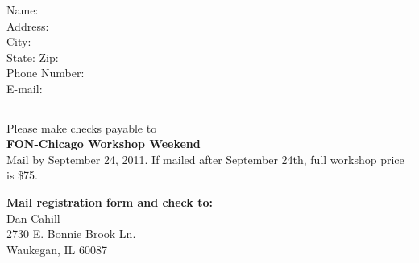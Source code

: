 \documentclass[letterpaper]{article}
\begin{document}
\begin{minipage}[h]{0.45\textwidth}
Name: \hrulefill{}\\

Address:  \hrulefill{}\\

City: \hrulefill{}\\

State: \hrulefill{} \hspace*{1em} Zip: \hrulefill{}\\

Phone Number: \hrulefill{}\\

E-mail: \hrulefill{}\\
\end{minipage}
\vspace*{2em}
\hrule
\vspace*{1em}
\begin{minipage}[b]{0.45\textwidth}
\vspace{0pt}
Please make checks payable to \\\textbf{FON-Chicago Workshop Weekend}\\Mail by September 24, 2011. If mailed after September 24th, full workshop price is \$75.


\vspace*{1em}

\hspace{0em}\textbf{Mail registration form and check to:}\\
Dan Cahill\\
2730 E. Bonnie Brook Ln.\\
Waukegan, IL 60087
\end{minipage}
\hfill
\begin{minipage}[b]{0.45\textwidth}

\end{minipage}
\end{document}
